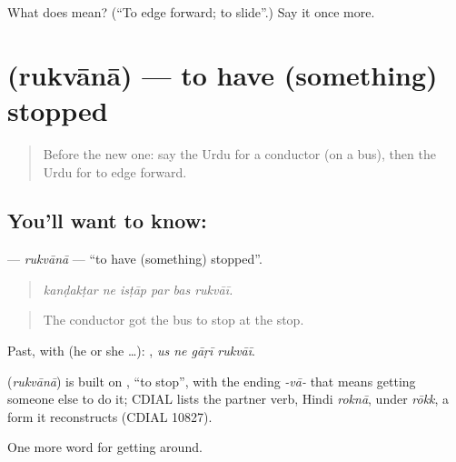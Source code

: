 \begin{tcolorbox}[breakable,colback=teal!4,colframe=teal!35!black,title={Before you move on}]
What does  mean? (\textquotedblleft{}To edge forward; to slide\textquotedblright{}.) Say it once more.
\end{tcolorbox}
\section[\texorpdfstring{\ur{رکوانا} (rukvānā)}{رکوانا (rukvānā)}]{ (rukvānā) — to have (something) stopped}

\label{lesson:UR-C393-rukvana}



\begin{quote}
Before the new one: say the Urdu for a conductor (on a bus), then the Urdu for to edge forward.
\end{quote}

\subsection*{You'll want to know: }
\textbf{} — \emph{rukvānā} — \textquotedblleft{}to have (something) stopped\textquotedblright{}.

\begin{quote}
     
\end{quote}

\begin{quote}
\emph{kanḍakṭar ne isṭāp par bas rukvāī.}
\end{quote}

\begin{quote}
The conductor got the bus to stop at the stop.
\end{quote}

Past, with  (he or she …):    , \emph{us ne gāṛī rukvāī}.

\begin{cousinweb}
\textbf{} (\emph{rukvānā}) is built on \textbf{}, \textquotedblleft{}to stop\textquotedblright{}, with the ending \emph{-vā-} that means getting someone else to do it; CDIAL lists the partner verb, Hindi \emph{roknā}, under \emph{rōkk}, a form it reconstructs (CDIAL 10827).
\end{cousinweb}

\begin{grammarlens}[title={What you've built}]
One more word for getting around.
\end{grammarlens}

